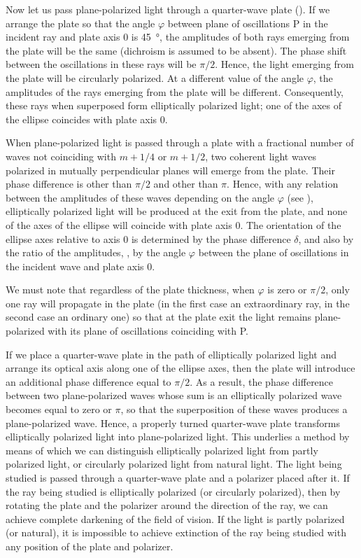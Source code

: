 Now let us pass plane-polarized light through a quarter-wave plate ().
If we arrange the plate so that the angle $\varphi$ between plane of oscillations P in the incident ray and plate axis $0$ is \SI{45}{\degree}, the amplitudes of both rays emerging from the plate will be the same (dichroism is assumed to be absent).
The phase shift between the oscillations in these rays will be $\pi/2$.
Hence, the light emerging from the plate will be circularly polarized.
At a different value of the angle $\varphi$, the amplitudes of the rays emerging from the plate will be different.
Consequently, these rays when superposed form elliptically polarized light; one of the axes of the ellipse coincides with plate axis $0$.

When plane-polarized light is passed through a plate with a fractional number of waves not coinciding with $m+1/4$ or $m+1/2$, two coherent light waves polarized in mutually perpendicular planes will emerge from the plate.
Their phase difference is other than $\pi/2$ and other than $\pi$.
Hence, with any relation between the amplitudes of these waves depending on the angle $\varphi$ (see ), elliptically polarized light will be produced at the exit from the plate, and none of the axes of the ellipse will coincide with plate axis $0$.
The orientation of the ellipse axes relative to axis $0$ is determined by the phase difference $\delta$, and also by the ratio of the amplitudes,
\ie, by the angle $\varphi$ between the plane of oscillations in the incident wave and plate axis $0$.

We must note that regardless of the plate thickness, when $\varphi$ is zero or $\pi/2$, only one ray will propagate in the plate (in the first case an extraordinary ray, in the second case an ordinary one) so that at the plate exit the light remains plane-polarized with its plane of oscillations coinciding with P.

If we place a quarter-wave plate in the path of elliptically polarized light and arrange its optical axis along one of the ellipse axes, then the plate will introduce an additional phase difference equal to $\pi/2$.
As a result, the phase difference between two plane-polarized waves whose sum is an elliptically polarized wave becomes equal to zero or $\pi$, so that the superposition of these waves produces a plane-polarized wave.
Hence, a properly turned quarter-wave plate transforms elliptically polarized light into plane-polarized light.
This underlies a method by means of which we can distinguish elliptically polarized light from partly polarized light, or circularly polarized light from natural light.
The light being studied is passed through a quarter-wave plate and a polarizer placed after it.
If the ray being studied is elliptically polarized (or circularly polarized), then by rotating the plate and the polarizer around the direction of the ray, we can achieve complete darkening of the field of vision.
If the light is partly polarized (or natural), it is impossible to achieve extinction of the ray being studied with any position of the plate and polarizer.

